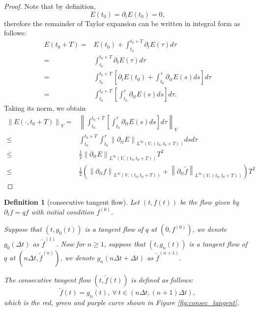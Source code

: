 \documentclass{article}
\newtheorem{defi}{Definition}
\numberwithin{equation}{section}
\begin{document}
\begin{proof}
Note that by definition,
\begin{equation*}
    E(t_{0}) = \partial_{t} E (t_{0}) = 0,
\end{equation*}
therefore the remainder of Taylor expansion can be written in integral form as follows:
    \begin{equation*}
    \begin{split}
        E(t_{0}+T) = &E(t_{0}) + \int_{t_{0}}^{t_{0}+T} \partial_{t} E (\tau) d\tau\\
    =&\int_{t_{0}}^{t_{0}+T} \partial_{t} E (\tau) d\tau\\
    =&\int_{t_{0}}^{t_{0}+T} \left[\partial_{t}E(t_{0}) + \int_{t_{0}}^{\tau} \partial_{tt} E (s)ds\right]d\tau\\
    =&\int_{t_{0}}^{t_{0}+T} \left[\int_{t_{0}}^{\tau} \partial_{tt} E (s)ds\right]d\tau.
    \end{split}
\end{equation*}
Taking its norm, we obtain
\begin{equation*}
    \begin{split}
         \left\lVert E(\cdot, t_{0} + T)\right\rVert_{V} =&  \left\lVert \int_{t_{0}}^{t_{0}+T} \left[\int_{t_{0}}^{\tau} \partial_{tt} E (s)ds\right]d\tau\right\rVert_{V}\\
         \leq& \int_{t_{0}}^{t_{0}+T} \int_{t_{0}}^{\tau} \left\lVert \partial_{tt} E\right\rVert_{L^{\infty}(V,(t_{0}, t_{0} + T))} ds d\tau \\
         \leq& \frac{1}{2}\left\lVert \partial_{tt} E\right\rVert_{L^{\infty}(V,(t_{0}, t_{0} + T))} T^{2}\\
         \leq &\frac{1}{2} \left( \left\lVert \partial_{tt} f\right\rVert_{L^{\infty}(V,(t_{0}, t_{0} + T))} + \left\lVert \partial_{tt} \widetilde{f} \right\rVert_{L^{\infty}(V,(t_{0}, t_{0} + T))} \right) T^{2}
    \end{split}
\end{equation*}
\end{proof}


\begin{defi}[consecutive tangent flow]
    Let $(t, f(t))$ be the flow given by $\partial_{t} f = qf$ with initial condition $f^{(0)}$. 

    Suppose that $(t,g_{0}(t))$ is a tangent flow of $q$ at $(0,f^{(0)})$, we denote $g_{0}(\Delta t)$ as $\widetilde{f}^{(1)}$. Now for $n\geq 1$, suppose that $(t,g_{n}(t))$ is a tangent flow of $q$ at $(n\Delta t, \widetilde{f}^{(n)})$, we denote $g_{n}(n\Delta t + \Delta t)$ as $\widetilde{f}^{(n+1)}$.

    The consecutive tangent flow $(t,\widetilde{f}(t))$ is defined as follows:
    \begin{equation}
        \widetilde{f}(t) = g_{n}(t), \ \forall\ t\in(n\Delta t, (n+1) \Delta t),
    \end{equation}
    which is the red, green and purple curve shown in Figure \ref{fig:consec_tangent}.
\end{defi}
\end{document}
